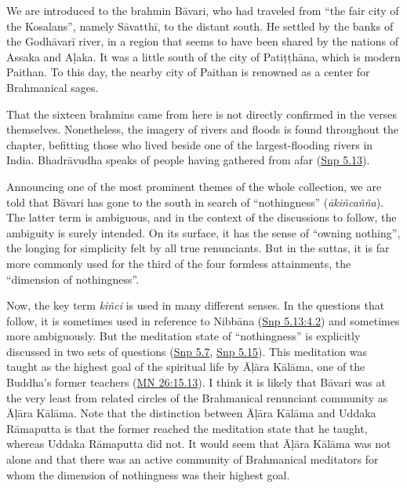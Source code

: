 \documentclass[12pt,openany]{book}%
\begin{document}
We are introduced to the brahmin \textsanskrit{Bāvari}, who had traveled from “the fair city of the Kosalans”, namely \textsanskrit{Sāvatthī}, to the distant south. He settled by the banks of the \textsanskrit{Godhāvarī} river, in a region that seems to have been shared by the nations of Assaka and \textsanskrit{Aḷaka}. It was a little south of the city of \textsanskrit{Patiṭṭhāna}, which is modern Paithan. To this day, the nearby city of Paithan is renowned as a center for Brahmanical sages.

That the sixteen brahmins came from here is not directly confirmed in the verses themselves. Nonetheless, the imagery of rivers and floods is found throughout the chapter, befitting those who lived beside one of the largest-flooding rivers in India. \textsanskrit{Bhadrāvudha} speaks of people having gathered from afar (\href{https://suttacentral.net/snp5.13/en/sujato}{Snp 5.13}).

Announcing one of the most prominent themes of the whole collection, we are told that \textsanskrit{Bāvari} has gone to the south in search of “nothingness” (\textit{\textsanskrit{ākiñcañña}}). The latter term is ambiguous, and in the context of the discussions to follow, the ambiguity is surely intended. On its surface, it has the sense of “owning nothing”, the longing for simplicity felt by all true renunciants. But in the suttas, it is far more commonly used for the third of the four formless attainments, the “dimension of nothingness”.

Now, the key term \textit{\textsanskrit{kiñci}} is used in many different senses. In the questions that follow, it is sometimes used in reference to \textsanskrit{Nibbāna} (\href{https://suttacentral.net/snp5.13/en/sujato\#4.2}{Snp 5.13:4.2}) and sometimes more ambiguously. But the meditation state of “nothingness” is explicitly discussed in two sets of questions (\href{https://suttacentral.net/snp5.7/en/sujato}{Snp 5.7}, \href{https://suttacentral.net/snp5.15/en/sujato}{Snp 5.15}). This meditation was taught as the highest goal of the spiritual life by \textsanskrit{Āḷāra} \textsanskrit{Kālāma}, one of the Buddha’s former teachers (\href{https://suttacentral.net/mn26/en/sujato\#15.13}{MN 26:15.13}). I think it is likely that \textsanskrit{Bāvari} was at the very least from related circles of the Brahmanical renunciant community as \textsanskrit{Āḷāra} \textsanskrit{Kālāma}. Note that the distinction between \textsanskrit{Āḷāra} \textsanskrit{Kālāma} and Uddaka \textsanskrit{Rāmaputta} is that the former reached the meditation state that he taught, whereas Uddaka \textsanskrit{Rāmaputta} did not. It would seem that \textsanskrit{Āḷāra} \textsanskrit{Kālāma} was not alone and that there was an active community of Brahmanical meditators for whom the dimension of nothingness was their highest goal.
\end{document}
